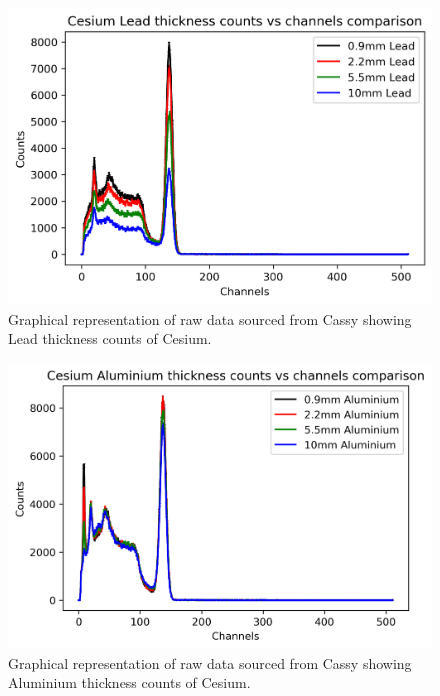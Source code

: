 \documentclass[12pt]{article}
\begin{document}
\begin{multicols}{2}
\begin{figure}[H]
\centering
\includegraphics[scale=0.6]{Images/CesiumLeadCounts.png}
\caption{Graphical representation of raw data sourced from Cassy showing Lead thickness counts of Cesium.}
\label{Cesium Lead Counts}
\end{figure}

\begin{figure}[H]
\centering
\includegraphics[scale=0.6]{Images/CesiumAluminiumCounts.png}
\caption{Graphical representation of raw data sourced from Cassy showing Aluminium thickness counts of Cesium.}
\label{Cesium Alu Counts}
\end{figure}
\end{multicols}
\newpage
\end{document}
